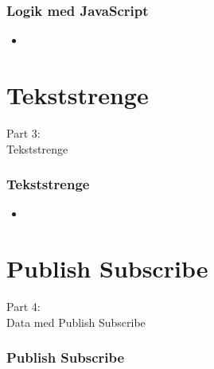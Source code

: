 \begin{frame}
    \frametitle{Logik med JavaScript}
    \begin{itemize}
      \item 
    \end{itemize}
\end{frame}

\section{Tekststrenge}
\begin{frame}
    \vspace{25mm}
    \begin{center}
        \Huge{Part 3:\\Tekststrenge}
    \end{center}
\end{frame}

\begin{frame}
    \frametitle{Tekststrenge}
    \begin{itemize}
      \item 
    \end{itemize}
\end{frame}

\section{Publish Subscribe}
\begin{frame}
    \vspace{25mm}
    \begin{center}
        \Huge{Part 4:\\Data med Publish Subscribe}
    \end{center}
\end{frame}

\begin{frame}
    \frametitle{Publish Subscribe}
    \vspace{10mm}
    \begin{center}
    \end{center}
\end{frame}

